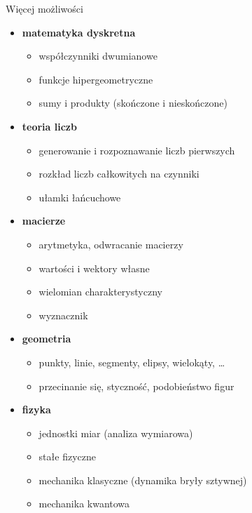 \documentclass[10pt]{beamer}
\begin{document}
\begin{frame}{Więcej możliwości}
  \scriptsize
  \begin{multicols}{2}
    \begin{itemize}
      \item \textbf{matematyka dyskretna}
        \begin{itemize}
          \tiny
          \item współczynniki dwumianowe
          \item funkcje hipergeometryczne
          \item sumy i produkty (skończone i nieskończone)
      \end{itemize}
      \item \textbf{teoria liczb}
        \begin{itemize}
          \tiny
          \item generowanie i rozpoznawanie liczb pierwszych
          \item rozkład liczb całkowitych na czynniki
          \item ułamki łańcuchowe
        \end{itemize}
      \item \textbf{macierze}
        \begin{itemize}
          \tiny
          \item arytmetyka, odwracanie macierzy
          \item wartości i wektory własne
          \item wielomian charakterystyczny
          \item wyznacznik
        \end{itemize}
      \item \textbf{geometria}
        \begin{itemize}
          \tiny
          \item punkty, linie, segmenty, elipsy, wielokąty, \ldots
          \item przecinanie się, styczność, podobieństwo figur
        \end{itemize}
      \item \textbf{fizyka}
        \begin{itemize}
          \tiny
          \item jednostki miar (analiza wymiarowa)
          \item stałe fizyczne
          \item mechanika klasyczne (dynamika bryły sztywnej)
          \item mechanika kwantowa

\end{itemize}
\end{itemize}
\end{multicols}
\end{frame}
\end{document}
